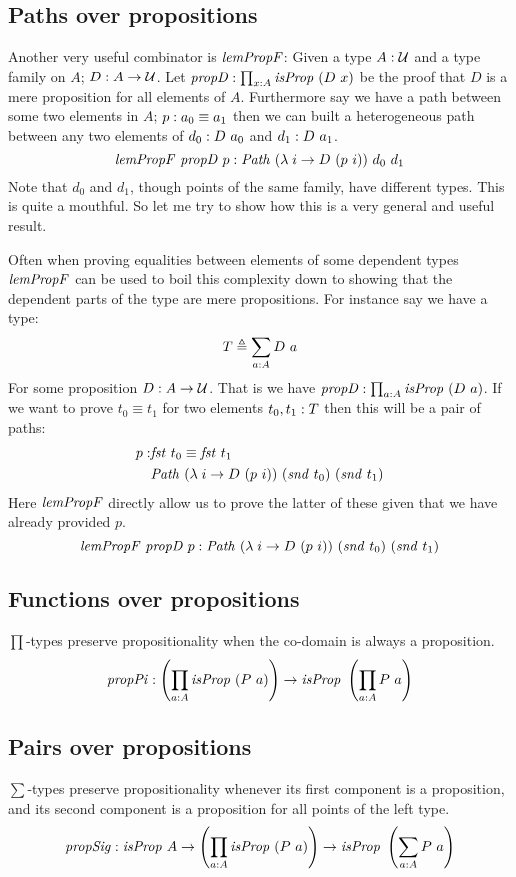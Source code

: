 \subsection{Paths over propositions}
\label{sec:lemPropF}
Another very useful combinator is $\lemPropF$: Given a type $A \mathrel{:}
\mathcal{U}$ and a type family on $A$; $D \mathrel{:} A \to \mathcal{U}$. Let $\var{propD}
\tp \prod_{x \tp A} \isProp\ (D\ x)$ be the proof that $D$ is a mere
proposition for all elements of $A$. Furthermore say we have a path
between some two elements in $A$; $p \mathrel{:} a_0 \equiv a_1$ then we can
built a heterogeneous path between any two elements of $d_0 \mathrel{:}
D\ a_0$ and $d_1 \mathrel{:} D\ a_1$.
%
$$
\lemPropF\ \var{propD}\ p \tp \Path\ (\lambda\; i \mto D\ (p\ i))\ d_0\ d_1
$$
%
Note that $d_0$ and $d_1$, though points of the same family, have
different types. This is quite a mouthful. So let me try to show how
this is a very general and useful result.

Often when proving equalities between elements of some dependent types
$\lemPropF$ can be used to boil this complexity down to showing that
the dependent parts of the type are mere propositions. For instance
say we have a type:
%
$$
T \mathrel{\triangleq} \sum_{a \mathrel{:} A} D\ a
$$
%
For some proposition $D \mathrel{:} A \to \mathcal{U}$. That is we have $\var{propD}
\tp \prod_{a \tp A} \isProp\ (D\ a)$. If we want to prove $t_0 \equiv
t_1$ for two elements $t_0, t_1 \mathrel{:} T$ then this will be a pair of
paths:
%
%
\begin{align*}
  p \tp & \fst\ t_0 \equiv \fst\ t_1 \\
        & \Path\ (\lambda\; i \to D\ (p\ i))\ (\snd\ t_0)\ (\snd\ t_1)
\end{align*}
%
Here $\lemPropF$ directly allow us to prove the latter of these given
that we have already provided $p$.
%
$$
\lemPropF\ \var{propD}\ p
  \tp \Path\ (\lambda\; i \to D\ (p\ i))\ (\snd\ t_0)\ (\snd\ t_1)
$$
%
\subsection{Functions over propositions}
\label{sec:propPi}
$\prod$-types preserve propositionality when the co-domain is always a
proposition.
%
$$
\mathit{propPi} \tp \left(\prod_{a \tp A} \isProp\ (P\ a)\right) \to \isProp\ \left(\prod_{a \tp A} P\ a\right)
$$
\subsection{Pairs over propositions}
\label{sec:propSig}
%
$\sum$-types preserve propositionality whenever its first component is
a proposition, and its second component is a proposition for all
points of the left type.
%
$$
\mathit{propSig} \tp \isProp\ A \to \left(\prod_{a \tp A} \isProp\ (P\ a)\right) \to \isProp\ \left(\sum_{a \tp A} P\ a\right)
$$
